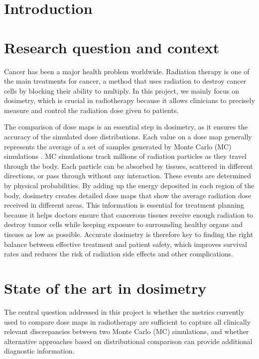 \documentclass[12pt]{article}
\begin{document}
\newpage

\section*{Introduction}
\vspace{2mm}
\indent

\newpage

\section{Research question and context}
Cancer has been a major health problem worldwide. Radiation therapy is one of the main treatments for cancer, a method that uses radiation to destroy cancer cells by blocking their ability to multiply. In this project, we mainly focus on dosimetry, which is crucial in radiotherapy because it allows clinicians to precisely measure and control the radiation dose given to patients.

The comparison of dose maps is an essential step in dosimetry, as it ensures the accuracy of the simulated dose distributions. Each value on a dose map generally represents the average of a set of samples generated by Monte Carlo (MC) simulations \cite{monte-carlo}. MC simulations track millions of radiation particles as they travel through the body. Each particle can be absorbed by tissues, scattered in different directions, or pass through without any interaction. These events are determined by physical probabilities. By adding up the energy deposited in each region of the body, dosimetry creates detailed dose maps that show the average radiation dose received in different areas. This information is essential for treatment planning because it helps doctors ensure that cancerous tissues receive enough radiation to destroy tumor cells while keeping exposure to surrounding healthy organs and tissues as low as possible. Accurate dosimetry is therefore key to finding the right balance between effective treatment and patient safety, which improves survival rates and reduces the risk of radiation side effects and other complications.



\newpage

\section{State of the art in dosimetry}

The central question addressed in this project is whether the metrics currently used to compare
dose maps in radiotherapy are sufficient to capture all clinically relevant discrepancies between
two Monte Carlo (MC) simulations, and whether alternative approaches based on distributional
comparison can provide additional diagnostic information.
\end{document}
